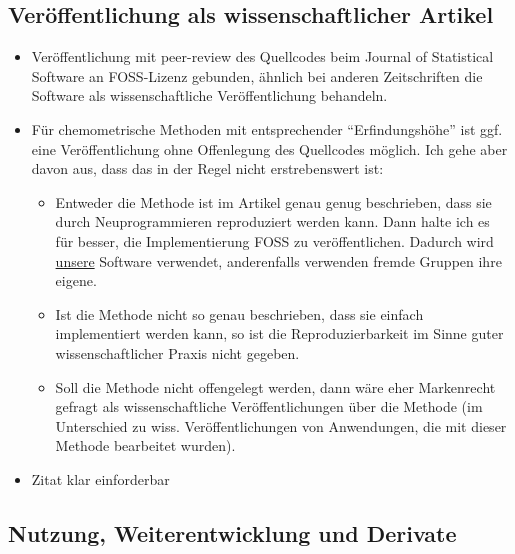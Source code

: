 \documentclass[11pt]{article}
\begin{document}
\subsection{Veröffentlichung als wissenschaftlicher Artikel}
\label{sec-2-3}

\begin{itemize}
\item Veröffentlichung mit peer-review des Quellcodes beim Journal of Statistical Software an FOSS-Lizenz
  gebunden, ähnlich bei anderen Zeitschriften die Software als wissenschaftliche Veröffentlichung behandeln.
\item Für chemometrische Methoden mit entsprechender ``Erfindungshöhe'' ist ggf. eine Veröffentlichung ohne
  Offenlegung des Quellcodes möglich. Ich gehe aber davon aus, dass das in der Regel nicht
  erstrebenswert ist:
\begin{itemize}
\item Entweder die Methode ist im Artikel genau genug beschrieben, dass sie durch Neuprogrammieren
     reproduziert werden kann. Dann halte ich es für besser, die Implementierung FOSS zu
     veröffentlichen. Dadurch wird \underline{unsere} Software verwendet, anderenfalls verwenden fremde Gruppen
     ihre eigene.
\item Ist die Methode nicht so genau beschrieben, dass sie einfach implementiert werden kann, so ist
     die Reproduzierbarkeit im Sinne guter wissenschaftlicher Praxis nicht gegeben.
\item Soll die Methode nicht offengelegt werden, dann wäre eher Markenrecht gefragt als
     wissenschaftliche Veröffentlichungen über die Methode (im Unterschied zu
     wiss. Veröffentlichungen von Anwendungen, die mit dieser Methode bearbeitet wurden).
\end{itemize}
\item Zitat klar einforderbar
\end{itemize}
\subsection{Nutzung, Weiterentwicklung und Derivate}
\label{sec-2-4}
\end{document}
